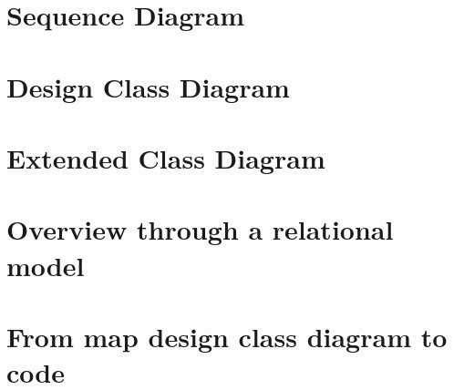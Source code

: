 \documentclass{report}
\begin{document}
\part{Sequence Diagram}
\part{Design Class Diagram}
\part{Extended Class Diagram}
\part{Overview through a relational model}
\part{From map design class diagram to code}
\end{document}
